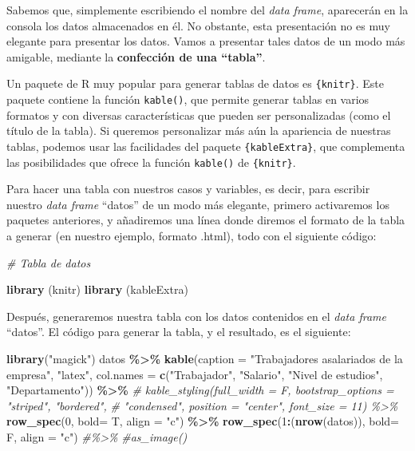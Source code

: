 \documentclass[
]{book}
\newenvironment{Shaded}{\begin{snugshade}}{\end{snugshade}}
\newcommand{\AttributeTok}[1]{\textcolor[rgb]{0.13,0.29,0.53}{#1}}
\newcommand{\CommentTok}[1]{\textcolor[rgb]{0.56,0.35,0.01}{\textit{#1}}}
\newcommand{\DecValTok}[1]{\textcolor[rgb]{0.00,0.00,0.81}{#1}}
\newcommand{\FunctionTok}[1]{\textcolor[rgb]{0.13,0.29,0.53}{\textbf{#1}}}
\newcommand{\NormalTok}[1]{#1}
\newcommand{\SpecialCharTok}[1]{\textcolor[rgb]{0.81,0.36,0.00}{\textbf{#1}}}
\newcommand{\StringTok}[1]{\textcolor[rgb]{0.31,0.60,0.02}{#1}}
\begin{document}
Sabemos que, simplemente escribiendo el nombre del \emph{data frame}, aparecerán en la consola los datos almacenados en él.
No obstante, esta presentación no es muy elegante para presentar los datos.
Vamos a presentar tales datos de un modo más amigable, mediante la \textbf{confección de una ``tabla''}.

Un paquete de R muy popular para generar tablas de datos es \texttt{\{knitr\}}.
Este paquete contiene la función \texttt{kable()}, que permite generar tablas en varios formatos y con diversas características que pueden ser personalizadas (como el título de la tabla).
Si queremos personalizar más aún la apariencia de nuestras tablas, podemos usar las facilidades del paquete \texttt{\{kableExtra\}}, que complementa las posibilidades que ofrece la función \texttt{kable()} de \texttt{\{knitr\}}.

Para hacer una tabla con nuestros casos y variables, es decir, para escribir nuestro \emph{data frame} ``datos'' de un modo más elegante, primero activaremos los paquetes anteriores, y añadiremos una línea donde diremos el formato de la tabla a generar (en nuestro ejemplo, formato .html), todo con el siguiente código:

\begin{Shaded}
\begin{Highlighting}[]
\CommentTok{\# Tabla de datos}

\FunctionTok{library}\NormalTok{ (knitr)}
\FunctionTok{library}\NormalTok{ (kableExtra)}
\end{Highlighting}
\end{Shaded}

Después, generaremos nuestra tabla con los datos contenidos en el \emph{data frame} ``datos''.
El código para generar la tabla, y el resultado, es el siguiente:

\begin{Shaded}
\begin{Highlighting}[]
  \FunctionTok{library}\NormalTok{(}\StringTok{"magick"}\NormalTok{)}
\NormalTok{  datos }\SpecialCharTok{\%\textgreater{}\%}
        \FunctionTok{kable}\NormalTok{(}\AttributeTok{caption =} \StringTok{"Trabajadores asalariados de la empresa"}\NormalTok{,}
              \StringTok{"latex"}\NormalTok{,}
              \AttributeTok{col.names =} \FunctionTok{c}\NormalTok{(}\StringTok{"Trabajador"}\NormalTok{, }\StringTok{"Salario"}\NormalTok{, }\StringTok{"Nivel de estudios"}\NormalTok{,}
                          \StringTok{"Departamento"}\NormalTok{))  }\SpecialCharTok{\%\textgreater{}\%}
\CommentTok{\#  kable\_styling(full\_width = F, bootstrap\_options = "striped", "bordered",}
\CommentTok{\#               "condensed", position = "center", font\_size = 11) \%\textgreater{}\%}
  \FunctionTok{row\_spec}\NormalTok{(}\DecValTok{0}\NormalTok{, }\AttributeTok{bold=}\NormalTok{ T, }\AttributeTok{align =} \StringTok{"c"}\NormalTok{) }\SpecialCharTok{\%\textgreater{}\%}
  \FunctionTok{row\_spec}\NormalTok{(}\DecValTok{1}\SpecialCharTok{:}\NormalTok{(}\FunctionTok{nrow}\NormalTok{(datos)), }\AttributeTok{bold=}\NormalTok{ F, }\AttributeTok{align =} \StringTok{"c"}\NormalTok{) }\CommentTok{\#\%\textgreater{}\%}
  \CommentTok{\#as\_image()}
\end{Highlighting}
\end{Shaded}
\end{document}
